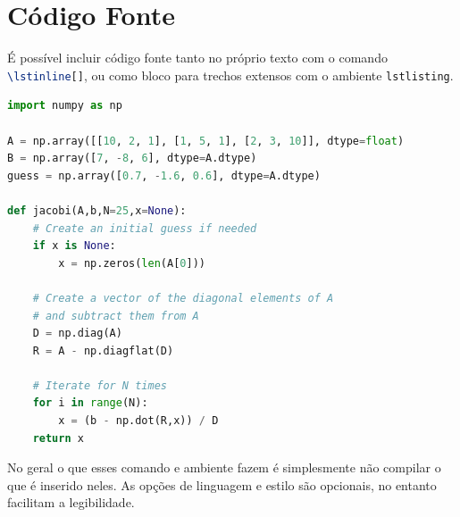 
\section{Código Fonte}
\label{sec:codigo}

    É possível incluir código fonte tanto no próprio texto com o comando \lstinline[language=TeX,style=Code]|\lstinline[]|, ou como bloco para trechos extensos com o ambiente \lstinline[language=TeX,style=Code]|lstlisting|.


    \begin{lstlisting}[language=Python,
        style=Code,
        caption={Método Jacobi em Python.},
        label={lst:jacobi},
        name=jacobi]
import numpy as np

A = np.array([[10, 2, 1], [1, 5, 1], [2, 3, 10]], dtype=float)
B = np.array([7, -8, 6], dtype=A.dtype)
guess = np.array([0.7, -1.6, 0.6], dtype=A.dtype)

def jacobi(A,b,N=25,x=None):
    # Create an initial guess if needed                                                                                                                                                            
    if x is None:
        x = np.zeros(len(A[0]))

    # Create a vector of the diagonal elements of A                                                                                                                                                
    # and subtract them from A                                                                                                                                                                     
    D = np.diag(A)
    R = A - np.diagflat(D)

    # Iterate for N times                                                                                                                                                                          
    for i in range(N):
        x = (b - np.dot(R,x)) / D
    return x
    \end{lstlisting}

    No geral o que esses comando e ambiente fazem é simplesmente não compilar o que é inserido neles.
    As opções de linguagem e estilo são opcionais, no entanto facilitam a legibilidade.


